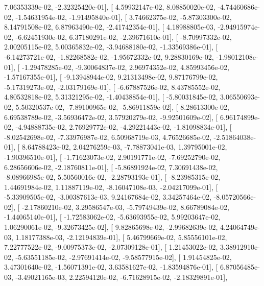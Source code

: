\documentclass{article}
\begin{document}
          7.06353339e-02,  -2.32325420e-01],
       [  4.59932147e-02,   8.08850020e-02,  -4.74460686e-02,
         -1.54631954e-02,  -1.91495840e-01],
       [  3.74662375e-02,  -5.87303300e-02,   8.14791508e-02,
          6.87963490e-02,  -2.41742354e-01],
       [  4.18988805e-03,  -2.94915974e-02,  -6.62451930e-02,
          6.37180291e-02,  -2.39671610e-01],
       [ -8.70997332e-02,   2.00205115e-02,   5.00365832e-02,
         -3.94688180e-02,  -1.33569386e-01],
       [ -6.14273721e-02,  -1.82268582e-02,  -1.95672332e-02,
          9.28830169e-02,  -1.98012108e-01],
       [ -1.29478285e-02,  -9.30064837e-02,   2.96974352e-02,
          4.85993456e-02,  -1.57167355e-01],
       [ -9.13948944e-02,   9.21313498e-02,   9.87176799e-02,
         -5.17319273e-02,  -2.03179169e-01],
       [ -6.67887526e-02,   8.43785552e-02,   4.80532818e-02,
          5.31321295e-02,  -1.40438854e-01],
       [ -5.80031845e-02,   3.06550693e-02,   5.50320537e-02,
         -7.89100965e-02,  -5.86911859e-02],
       [  8.28613300e-02,   6.69538789e-02,  -3.56936472e-02,
          3.57920279e-02,  -9.92501609e-02],
       [  6.96174899e-02,  -4.94888735e-02,   2.76929772e-02,
         -4.29221443e-02,  -1.81098834e-01],
       [ -8.02542698e-02,  -7.33976987e-02,   6.50968719e-03,
          4.76526685e-02,  -2.51864038e-01],
       [  8.64788423e-02,   2.04276259e-03,  -7.78873041e-03,
          1.39795001e-02,  -1.90396510e-01],
       [ -1.71623073e-02,   2.90191771e-02,  -7.69252790e-02,
          6.28656606e-02,  -2.18760811e-01],
       [ -5.86891924e-02,   7.30691438e-02,  -8.08966985e-02,
          5.50560016e-02,  -2.28793193e-01],
       [ -8.23985315e-02,   1.44691984e-02,   1.11887119e-02,
         -8.16047108e-03,  -2.04217099e-01],
       [ -5.33909505e-02,  -3.00387613e-03,   9.24167684e-02,
          3.34257464e-02,  -8.05720566e-02],
       [ -2.17860210e-02,   3.29586547e-03,  -5.79749439e-02,
          8.66789084e-02,  -1.44065140e-01],
       [ -1.72583062e-02,  -5.63693955e-02,   5.99203647e-02,
          1.06290061e-02,  -9.32673425e-02],
       [  9.82865698e-02,  -2.99682639e-02,   4.24064749e-03,
          1.18177388e-03,  -2.12194839e-01],
       [  5.46799669e-02,   5.85556101e-02,   7.22777522e-02,
         -9.00975373e-02,  -2.07309128e-01],
       [  1.21453022e-02,   3.38912910e-02,  -5.63551185e-02,
         -2.97691414e-02,  -9.58577915e-02],
       [  1.91454825e-02,   3.47301640e-02,  -1.56071391e-02,
          3.63581627e-02,  -1.83594876e-01],
       [  6.87056485e-03,  -3.49021165e-03,   2.22594120e-02,
         -6.71628915e-02,  -2.18329891e-01],
\end{document}
